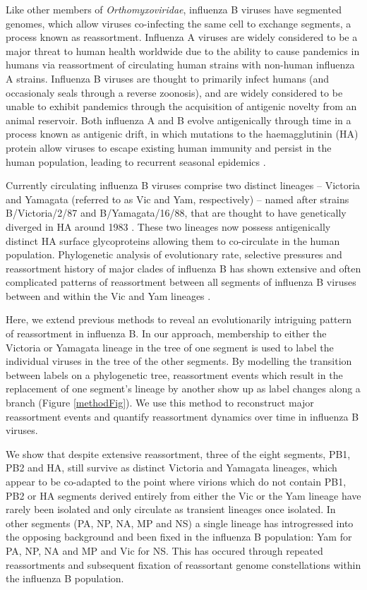 \documentclass[11pt,oneside,letterpaper]{article}
\begin{document}
Like other members of \textit{Orthomyxoviridae}, influenza B viruses have segmented genomes, which allow viruses co-infecting the same cell to exchange segments, a process known as reassortment. 
Influenza A viruses are widely considered to be a major threat to human health worldwide due to the ability to cause pandemics in humans via reassortment of circulating human strains with non-human influenza A strains. 
Influenza B viruses are thought to primarily infect humans (and occasionaly seals \cite{osterhaus2000,bodewes2013} through a reverse zoonosis), and are widely considered to be unable to exhibit pandemics through the acquisition of antigenic novelty from an animal reservoir. 
Both influenza A and B evolve antigenically through time in a process known as antigenic drift, in which mutations to the haemagglutinin (HA) protein allow viruses to escape existing human immunity and persist in the human population, leading to recurrent seasonal epidemics \cite{bedford2014}.

Currently circulating influenza B viruses comprise two distinct lineages -- Victoria and Yamagata (referred to as Vic and Yam, respectively) -- named after strains B/Victoria/2/87 and B/Yamagata/16/88, that are thought to have genetically diverged in HA around 1983 \cite{rota1990}. 
These two lineages now possess antigenically distinct HA surface glycoproteins \cite{kanegae1990,rota1990,nerome1998,nakagawa2002,ansaldi2003} allowing them to co-circulate in the human population.
Phylogenetic analysis of evolutionary rate, selective pressures and reassortment history of major clades of influenza B has shown extensive and often complicated patterns of reassortment between all segments of influenza B viruses between and within the Vic and Yam lineages \cite{chen2008}.

Here, we extend previous methods to reveal an evolutionarily intriguing pattern of reassortment in influenza B.
In our approach, membership to either the Victoria or Yamagata lineage in the tree of one segment is used to label the individual viruses in the tree of the other segments.
By modelling the transition between labels on a phylogenetic tree, reassortment events which result in the replacement of one segment's lineage by another show up as label changes along a branch (Figure \ref{methodFig}).
We use this method to reconstruct major reassortment events and quantify reassortment dynamics over time in influenza B viruses.

We show that despite extensive reassortment, three of the eight segments, PB1, PB2 and HA, still survive as distinct Victoria and Yamagata lineages, which appear to be co-adapted to the point where virions which do not contain PB1, PB2 or HA segments derived entirely from either the Vic or the Yam lineage have rarely been isolated and only circulate as transient lineages once isolated.
In other segments (PA, NP, NA, MP and NS) a single lineage has introgressed into the opposing background and been fixed in the influenza B population: Yam for PA, NP, NA and MP and Vic for NS.
This has occured through repeated reassortments and subsequent fixation of reassortant genome constellations within the influenza B population.
\end{document}
